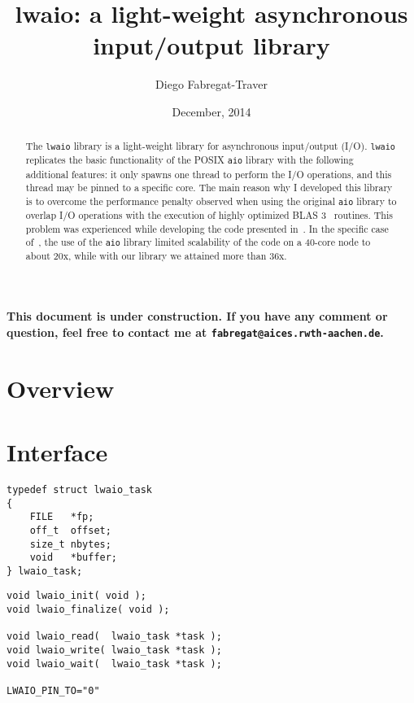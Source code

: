 \documentclass[a4paper,10pt]{article}
\newcommand{\lwaio}[0]{{\tt lwaio}}
\begin{document}
\title{lwaio: a light-weight asynchronous input/output library}

\author{Diego Fabregat-Traver}

\date{December, 2014}

\maketitle

\begin{abstract}
The \lwaio{} library is a light-weight library for asynchronous input/output (I/O).
\lwaio{} replicates the basic functionality of the POSIX {\tt aio} library with
the following additional features: it only spawns one thread to perform the I/O
operations, and this thread may be pinned to a specific core. The main reason
why I developed this library is to overcome the performance penalty observed when
using the original {\tt aio} library to overlap I/O operations
with the execution of highly optimized BLAS 3~\cite{BLAS3} routines.
This problem was experienced while developing the code presented in~\cite{OmicABEL-SingleTrait,OmicABEL-noMM}.
In the specific case of~\cite{OmicABEL-noMM}, the use of the {\tt aio} library limited scalability of the
code on a 40-core node to about 20x, while with our library we attained more than 36x.
\end{abstract}

\vspace{5mm}

{\large \bf This document is under construction. If you have any comment or question, feel
free to contact me at {\tt fabregat@aices.rwth-aachen.de}.}

\vspace{5mm}

\section{Overview}


\section{Interface}

\begin{verbatim}
typedef struct lwaio_task
{
    FILE   *fp;
    off_t  offset;
    size_t nbytes;
    void   *buffer;
} lwaio_task;
\end{verbatim}

\begin{verbatim}
void lwaio_init( void );
void lwaio_finalize( void );

void lwaio_read(  lwaio_task *task );
void lwaio_write( lwaio_task *task );
void lwaio_wait(  lwaio_task *task );

LWAIO_PIN_TO="0"
\end{verbatim}
\end{document}
